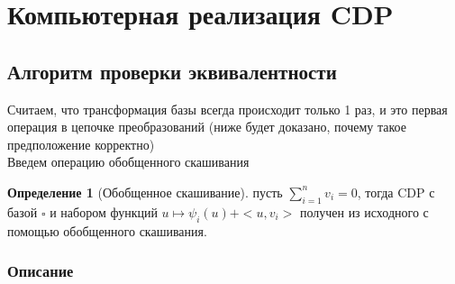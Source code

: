 \documentclass[16pt]{article}
\theoremstyle{definition}
\newtheorem{definition}{Определение}[section]
\begin{document}
\section{Компьютерная реализация CDP}
\subsection{Алгоритм проверки эквивалентности}
Считаем, что трансформация базы всегда происходит только 1 раз, и это первая операция в цепочке преобразований (ниже будет доказано, почему такое предположение корректно)
\\
Введем операцию обобщенного скашивания

\begin{definition}[Обобщенное скашивание]
пусть $\sum_{i=1}^n v_i = 0$, тогда CDP с базой $\square$ и набором функций $u \mapsto \psi_i(u) + <u, v_i>$ получен из исходного с помощью обобщенного скашивания.
\end{definition}

\subsubsection{Описание}
\end{document}
